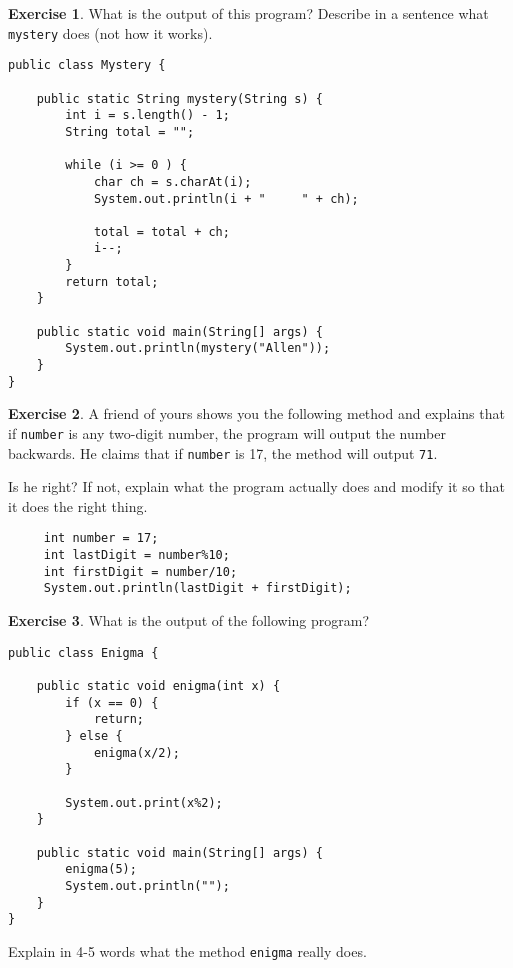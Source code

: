 \documentclass[12pt]{book}
\theoremstyle{definition}
\newtheorem{excz}{Exercise}[chapter]
\newenvironment{exercise}{\bigskip\begin{excz}\mbox{}}{\end{excz}}
\begin{document}
\begin{exercise}

What is the output of this program?  Describe in a sentence
what {\tt mystery} does (not how it works).

\begin{lstlisting}
public class Mystery {

    public static String mystery(String s) {
        int i = s.length() - 1;
        String total = "";

        while (i >= 0 ) {
            char ch = s.charAt(i);
            System.out.println(i + "     " + ch);

            total = total + ch;
            i--;
        }
        return total;
    }

    public static void main(String[] args) {
        System.out.println(mystery("Allen"));
    }
}
\end{lstlisting}

\end{exercise}


\begin{exercise}
A friend of yours shows you the following method and
explains that if {\tt number} is any two-digit number, the program
will output the number backwards.  He claims that if {\tt number} is
17, the method will output {\tt 71}.

Is he right?  If not, explain what the program actually does and
modify it so that it does the right thing.

\begin{lstlisting}
     int number = 17;
     int lastDigit = number%10;
     int firstDigit = number/10;
     System.out.println(lastDigit + firstDigit);
\end{lstlisting}

\end{exercise}

\begin{exercise}
What is the output of the following program?

\begin{lstlisting}
public class Enigma {

    public static void enigma(int x) {
        if (x == 0) {
            return;
        } else {
            enigma(x/2);
        } 

        System.out.print(x%2);
    }

    public static void main(String[] args) {
        enigma(5);
        System.out.println("");
    }
}
\end{lstlisting}

Explain in 4-5 words what the method {\tt enigma} really does.
\end{exercise}
\end{document}
